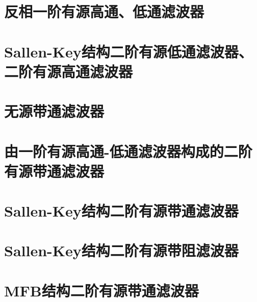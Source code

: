 \documentclass{ctexart}
\begin{document}
	\newpage
	\section{反相一阶有源高通、低通滤波器}
		

	\newpage
	\section{Sallen-Key结构二阶有源低通滤波器、二阶有源高通滤波器}
		

	\newpage
	\section{无源带通滤波器}
			

	\newpage
	\section{由一阶有源高通-低通滤波器构成的二阶有源带通滤波器}
			

	\newpage
	\section{Sallen-Key结构二阶有源带通滤波器}
		
		
	\newpage
	\section{Sallen-Key结构二阶有源带阻滤波器}
			

	\newpage
	\section{MFB结构二阶有源带通滤波器}
		
\end{document}
